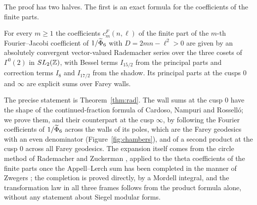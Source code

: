 The proof has two halves. The first is an exact formula for the coefficients of the finite parts.

\begin{mainthm}\label{thm:radB}
For every $m\ge1$ the coefficients $c^F_m(n,\ell)$ of the finite part of the $m$-th Fourier--Jacobi coefficient of $1/\widetilde\Phi_6$ with $D=2mn-\ell^2>0$ are given by an absolutely convergent vector-valued Rademacher series over the three cosets of $\Gamma^0(2)$ in $SL_2(\mathbb{Z})$, with Bessel terms $I_{15/2}$ from the principal parts and correction terms $I_8$ and $I_{17/2}$ from the shadow. Its principal parts at the cusps $0$ and $\infty$ are explicit sums over Farey walls.
\end{mainthm}

The precise statement is Theorem~\ref{thm:rad}. The wall sums at the cusp $0$ have the shape of the continued-fraction formula of Cardoso, Nampuri and Rossell\'o; we prove them, and their counterpart at the cusp $\infty$, by following the Fourier coefficients of $1/\widetilde\Phi_6$ across the walls of its poles, which are the Farey geodesics with an even denominator (Figure~\ref{fig:chambers}), and of a second product at the cusp $0$ across all Farey geodesics. The expansion itself comes from the circle method of Rademacher and Zuckerman \cite{RZ38,Zuc39}, applied to the theta coefficients of the finite parts once the Appell--Lerch sum has been completed in the manner of Zwegers \cite{Zwe02}; the completion is proved directly, by a Mordell integral, and the transformation law in all three frames follows from the product formula alone, without any statement about Siegel modular forms.

